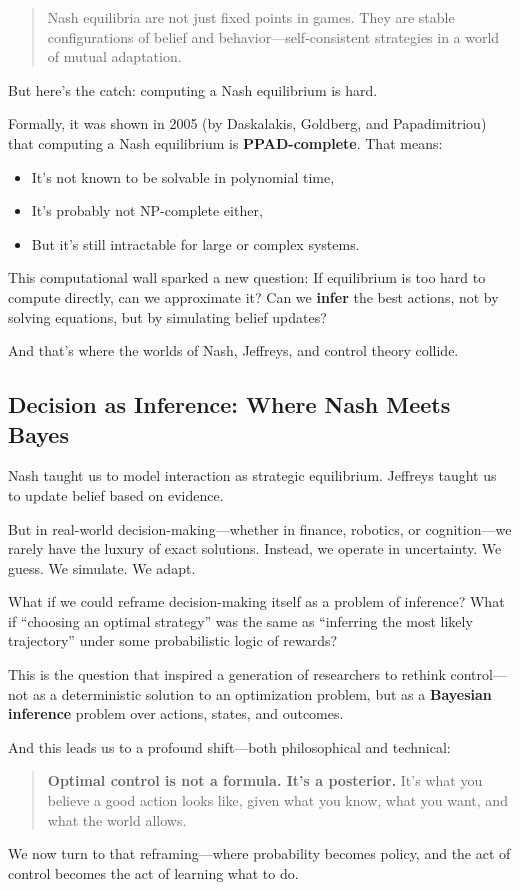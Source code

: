 \begin{quote}
Nash equilibria are not just fixed points in games.  
They are stable configurations of belief and behavior—self-consistent strategies in a world of mutual adaptation.
\end{quote}

But here’s the catch: computing a Nash equilibrium is hard.

Formally, it was shown in 2005 (by Daskalakis, Goldberg, and Papadimitriou) that computing a Nash equilibrium is \textbf{PPAD-complete}. That means:

\begin{itemize}
  \item It’s not known to be solvable in polynomial time,
  \item It’s probably not NP-complete either,
  \item But it’s still intractable for large or complex systems.
\end{itemize}

This computational wall sparked a new question:  
If equilibrium is too hard to compute directly, can we approximate it? Can we \textbf{infer} the best actions, not by solving equations, but by simulating belief updates?

And that’s where the worlds of Nash, Jeffreys, and control theory collide.

\subsection{Decision as Inference: Where Nash Meets Bayes}

Nash taught us to model interaction as strategic equilibrium.  
Jeffreys taught us to update belief based on evidence.  

But in real-world decision-making—whether in finance, robotics, or cognition—we rarely have the luxury of exact solutions. Instead, we operate in uncertainty. We guess. We simulate. We adapt.

What if we could reframe decision-making itself as a problem of inference?  
What if “choosing an optimal strategy” was the same as “inferring the most likely trajectory” under some probabilistic logic of rewards?

This is the question that inspired a generation of researchers to rethink control—not as a deterministic solution to an optimization problem, but as a \textbf{Bayesian inference} problem over actions, states, and outcomes.

And this leads us to a profound shift—both philosophical and technical:

\begin{quote}
\textbf{Optimal control is not a formula. It’s a posterior.}  
It’s what you believe a good action looks like, given what you know, what you want, and what the world allows.
\end{quote}

\vspace{0.8em}
\noindent
We now turn to that reframing—where probability becomes policy, and the act of control becomes the act of learning what to do.

